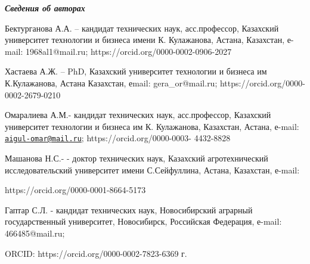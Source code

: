 \begin{authorinfo}
\emph{{\bfseries Сведения об авторах}}

Бектурганова А.А. -- кандидат технических наук, асс.профессор, Казахский
университет технологии и бизнеса имени К. Кулажанова, Астана, Казахстан,
е-mail: 1968al1@mail.ru; https://orcid.org/0000-0002-0906-2027

Хастаева А.Ж. -- PhD, Казахский университет технологии и бизнеса им
К.Кулажанова, Астана Казахстан, еmail:
gera\_or@mail.ru;
https://orcid.org/0000-0002-2679-0210

Омаралиева А.М.- кандидат технических наук, асс.профессор, Казахский
университет технологии и бизнеса им К. Кулажанова, Казахстан, Астана,
е-mail:
\href{mailto:aigul-omar@mail.ru}{\nolinkurl{aigul-omar@mail.ru}};
https://orcid.org/0000-0003- 4432-8828

Машанова Н.С.- - доктор технических наук, Казахский агротехнический
исследовательский университет имени С.Сейфуллина, Астана, Казахстан,
е-mail:

https://orcid.org/0000-0001-8664-5173

Гаптар С.Л. - кандидат технических наук, Новосибирский аграрный
государственный университет, Новосибирск, Российская Федерация, е-mail:
466485@mail.ru;

ORCID: https://orcid.org/0000-0002-7823-6369 г.\
\end{authorinfo}
